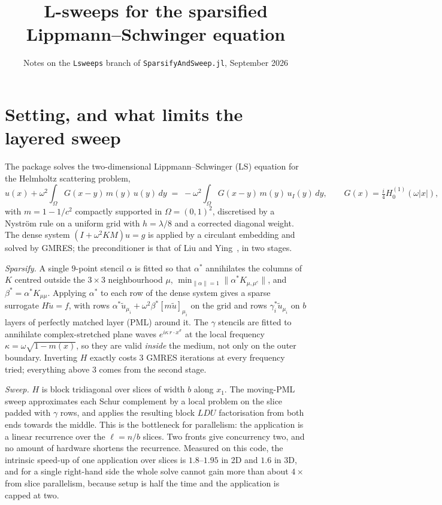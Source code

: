 \documentclass[11pt]{article}
\title{L-sweeps for the sparsified Lippmann--Schwinger equation}
\date{Notes on the \texttt{Lsweeps} branch of \texttt{SparsifyAndSweep.jl}, September 2026}
\author{}
\newcommand{\Om}{\Omega}
\begin{document}
\maketitle
\vspace{-2em}

\section{Setting, and what limits the layered sweep}

The package solves the two-dimensional Lippmann--Schwinger (LS) equation for the
Helmholtz scattering problem,
\begin{equation}
  u(x) + \omega^2\!\int_\Om G(x-y)\,m(y)\,u(y)\,dy \;=\; -\omega^2\!\int_\Om G(x-y)\,m(y)\,u_I(y)\,dy,
  \qquad G(x)=\tfrac{i}{4}H^{(1)}_0(\omega|x|),
  \label{eq:ls}
\end{equation}
with $m=1-1/c^2$ compactly supported in $\Om=(0,1)^2$, discretised by a Nystr\"om rule on a
uniform grid with $h=\lambda/8$ and a corrected diagonal weight. The dense system
$(I+\omega^2 KM)u=g$ is applied by a circulant embedding and solved by GMRES; the
preconditioner is that of Liu and Ying~\cite{LiuYing2018}, in two stages.

\emph{Sparsify.} A single $9$-point stencil $\alpha$ is fitted so that $\alpha^*$
annihilates the columns of $K$ centred outside the $3\times3$ neighbourhood $\mu$,
$\min_{\|\alpha\|=1}\|\alpha^*K_{\mu,\mu^c}\|$, and $\beta^*=\alpha^*K_{\mu\mu}$. Applying
$\alpha^*$ to each row of the dense system gives a sparse surrogate $H\tilde u=f$, with rows
$\alpha^*\tilde u_{\mu_i}+\omega^2\beta^*[m\tilde u]_{\mu_i}$ on the grid and rows
$\gamma_i^*\tilde u_{\mu_i}$ on $b$ layers of perfectly matched layer (PML) around it. The
$\gamma$ stencils are fitted to annihilate complex-stretched plane waves
$e^{i\kappa\,r\cdot x^\sigma}$ at the local frequency $\kappa=\omega\sqrt{1-m(x)}$, so they
are valid \emph{inside} the medium, not only on the outer boundary. Inverting $H$ exactly
costs $3$ GMRES iterations at every frequency tried; everything above $3$ comes from the
second stage.

\emph{Sweep.} $H$ is block tridiagonal over slices of width $b$ along $x_1$. The moving-PML
sweep approximates each Schur complement by a local problem on the slice padded with
$\gamma$ rows, and applies the resulting block $LDU$ factorisation from both ends towards
the middle. This is the bottleneck for parallelism: the application is a linear
recurrence over the $\ell=n/b$ slices. Two fronts give concurrency two, and no amount of
hardware shortens the recurrence. Measured on this code, the intrinsic speed-up of one
application over slices is $1.8$--$1.95$ in 2D and $1.6$ in 3D, and for a single
right-hand side the whole solve cannot gain more than about $4\times$ from slice
parallelism, because setup is half the time and the application is capped at two.
\end{document}
